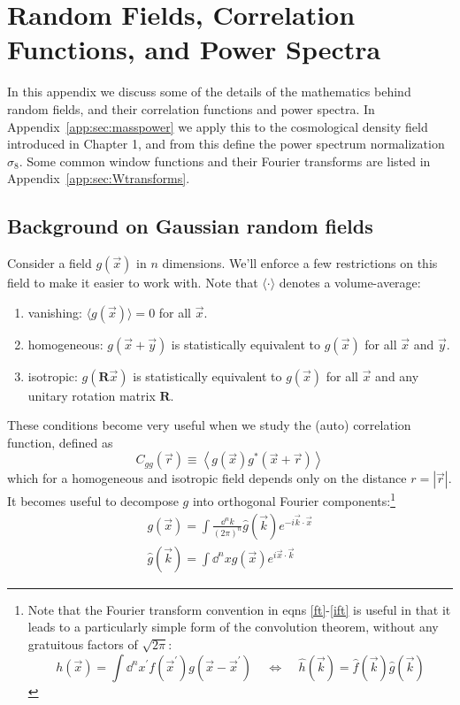 \chapter{Random Fields, Correlation Functions, and Power Spectra}
\label{app:RandomFields}

In this appendix we discuss some of the details of the mathematics behind
random fields, and their correlation functions and power spectra.
In Appendix~\ref{app:sec:masspower} we
apply this to the cosmological density field introduced in
Chapter 1, and from this define the power spectrum normalization
$\sigma_8$.
Some common window functions and their Fourier transforms are listed
in Appendix~\ref{app:sec:Wtransforms}.

\section{Background on Gaussian random fields}
\label{app:sec:background}
Consider a field $g(\vec x)$ in $n$ dimensions. We'll enforce a 
few restrictions on this field to make it easier to work with.
Note that $\langle\cdot\rangle$ denotes a volume-average:
\begin{enumerate}
  \item vanishing: $\langle g(\vec x)\rangle=0$ 
    for all $\vec x$.
  \item homogeneous: $g(\vec x + \vec y)$ is statistically equivalent to
    $g(\vec x)$ for all $\vec x$ and $\vec y$.
  \item isotropic: $g(\mathbf{R}\vec x)$ is statistically equivalent to
    $g(\vec x)$ for all $\vec x$ and any unitary rotation matrix $\mathbf{R}$.
\end{enumerate}
These conditions become very useful when we study the 
(auto) correlation function, defined as
\begin{equation}
  \label{Cgg}
  C_{gg}(\vec r) \equiv \left\langle g(\vec x) g^*(\vec x+\vec{r})\right\rangle
\end{equation}
which for a homogeneous and isotropic field depends only on the 
distance $r = |\vec r|$.  It becomes useful to decompose $g$ into
orthogonal Fourier components:\footnote{
  Note that the Fourier transform convention in eqns \ref{ft}-\ref{ift}
  is useful in that it leads to a particularly simple form of the 
  convolution theorem, without any gratuitous factors of $\sqrt{2\pi}$:
  \begin{displaymath}
    h(\vec x) = \int\dd^nx^\prime 
    f(\vec x^\prime)g(\vec x-\vec x^\prime)
    \ \ \ \ \ \Longleftrightarrow\ \ \ \ \ 
    \hat h(\vec k) = \hat f(\vec k)\hat g(\vec k)
  \end{displaymath}
}
\begin{eqnarray}
  \label{ft}
  g(\vec x) = \int \frac{\dd^nk}{(2\pi)^n} \hat{g}(\vec k)
  e^{-i\vec k\cdot\vec x}\\
  \label{ift}
  \hat{g}(\vec k) = \int \dd^nx g(\vec x)e^{i\vec x\cdot\vec k}
\end{eqnarray}

